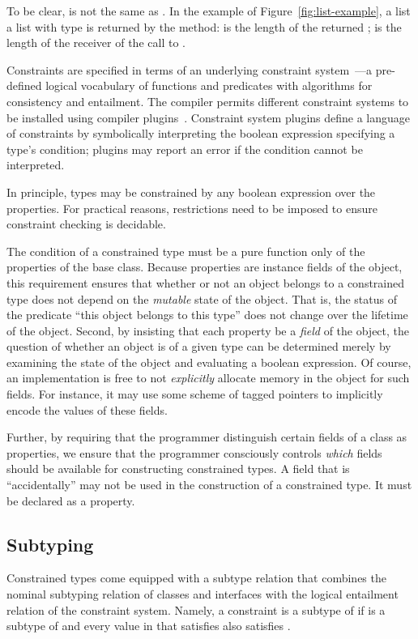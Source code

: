 To be clear,  is not the same as .  In the
 example of Figure~\ref{fig:list-example}, a list
a list with type
 is returned by the 
 method:   is the length of
the returned ;  is the length of the 
receiver of the call to .

Constraints are specified in terms of an underlying
constraint system~\cite{CCCC}---a pre-defined logical vocabulary of
functions and predicates with algorithms for consistency and
entailment.  The \Xten{} compiler permits different constraint
systems to be installed using compiler
plugins~\cite{bracha04-pluggable}.
%
Constraint system plugins define a language of constraints by
symbolically interpreting
the boolean expression specifying a type's condition; plugins
may report an error if the condition cannot be interpreted.

In principle, types may be constrained by any boolean
expression over the properties.  For practical reasons,
restrictions need to be imposed to ensure constraint checking is
decidable.

The condition of a constrained type must be a pure
function only of the properties of the base class.
Because properties are
 instance fields of the object,
this requirement
ensures that whether or not an object belongs to a constrained type does
not depend on the {\em mutable} state of the object.
That is, the status of the
predicate ``this object belongs to this type'' does not
change over the lifetime of the object.  Second, by insisting that each
property be a {\em field} of the object, the question of
whether an object is of a given type can be
determined merely by examining the state of the object and evaluating
a boolean expression. Of course, an implementation is free to not {\em
explicitly} allocate memory in the object for such fields. For
instance, it may use some scheme of tagged pointers to implicitly
encode the values of these fields.

Further, by requiring that the programmer distinguish certain
 fields of a class as properties, we ensure that the programmer
consciously controls {\em which}  fields should be available for
constructing constrained types. A field that is ``accidentally''
 may not be used in the construction of a constrained type. It must be
declared as a property.


\subsection{Subtyping}
Constrained types come equipped with a subtype relation that
combines the nominal subtyping relation of classes and interfaces with
the logical entailment relation of the constraint system. Namely, a
constraint  is a subtype of  if  is a
subtype of  and every value in  that satisfies 
also satisfies .

